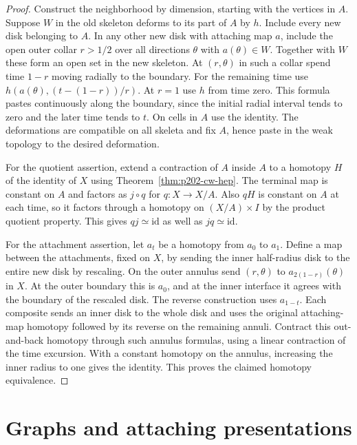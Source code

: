 \documentclass[11pt,oneside,openany]{book}
\theoremstyle{plain}
\theoremstyle{definition}
\theoremstyle{remark}
\begin{document}
\begin{proof}
Construct the neighborhood by dimension, starting with
the vertices in \(A\). Suppose \(W\) in the old skeleton
deforms to its part of \(A\) by \(h\). Include every new
disk belonging to \(A\). In any other new disk with
attaching map \(a\), include the open outer collar
\(r>1/2\) over all directions \(\theta\) with
\(a(\theta)\in W\). Together with \(W\) these form an open
set in the new skeleton. At \((r,\theta)\) in such a
collar spend time \(1-r\) moving radially to the boundary.
For the remaining time use
\(h(a(\theta),(t-(1-r))/r)\). At \(r=1\) use \(h\) from
time zero. This formula pastes continuously along the
boundary, since the initial radial interval tends to
zero and the later time tends to \(t\). On cells in \(A\)
use the identity. The deformations are compatible on all
skeleta and fix \(A\), hence paste in the weak topology
to the desired deformation.

For the quotient assertion, extend a contraction of \(A\)
inside \(A\) to a homotopy \(H\) of the identity of \(X\)
using Theorem~\ref{thm:p202-cw-hep}. The terminal map is
constant on \(A\) and factors as \(j\circ q\) for
\(q:X\to X/A\). Also \(qH\) is constant on \(A\) at
each time, so it factors through a homotopy on
\((X/A)\times I\) by the product quotient property.
This gives \(qj\simeq\mathrm{id}\) as well as
\(jq\simeq\mathrm{id}\).

For the attachment assertion, let \(a_t\) be a homotopy
from \(a_0\) to \(a_1\). Define a map between the
attachments, fixed on \(X\), by sending the inner
half-radius disk to the entire new disk by rescaling.
On the outer annulus send \((r,\theta)\) to
\(a_{2(1-r)}(\theta)\) in \(X\). At the outer boundary
this is \(a_0\), and at the inner interface it agrees
with the boundary of the rescaled disk. The reverse
construction uses \(a_{1-t}\). Each composite sends an
inner disk to the whole disk and uses the original
attaching-map homotopy followed by its reverse on the
remaining annuli. Contract this out-and-back homotopy
through such annulus formulas, using a linear contraction
of the time excursion. With a constant homotopy on the
annulus, increasing the inner radius to one gives the
identity. This proves the claimed homotopy equivalence.
\end{proof}

\section{Graphs and attaching presentations}\label{p202:T04}
\end{document}
